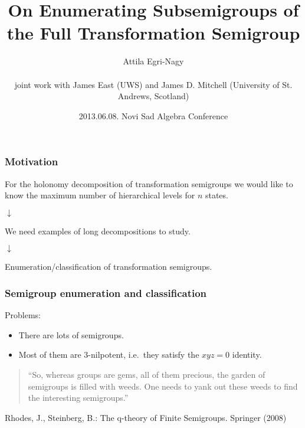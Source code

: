 \documentclass{beamer}
\newcommand{\jump}{\vskip6pt}
\begin{document}
\title[Subsemigroup Enumeration]{On Enumerating Subsemigroups of the Full Transformation Semigroup }
\author[e-n@]{Attila Egri-Nagy\\\ \\joint work with James East (UWS) and James D. Mitchell (University of St. Andrews, Scotland)}
\date[NSAC 2013]{2013.06.08. Novi Sad Algebra Conference}

\begin{frame}
\titlepage
\end{frame}

\begin{frame}\frametitle{Motivation}
\begin{center}
For the holonomy decomposition of transformation semigroups we would like to know the maximum number of hierarchical levels for $n$ states.
\centerline{$\downarrow$}
We need examples of long decompositions to study.
\centerline{$\downarrow$}
Enumeration/classification of transformation semigroups.
\end{center}
\end{frame}

\begin{frame}\frametitle{Semigroup enumeration and classification}
Problems:
\begin{itemize}
\item There are lots of semigroups.
\item Most of them are 3-nilpotent, i.e.\ they satisfy the $xyz=0$ identity.
\end{itemize}
\jump

\begin{quote}
``So, whereas groups are
gems, all of them precious, the garden of semigroups is filled with weeds. One
needs to yank out these weeds to find the interesting semigroups.''
\end{quote}
Rhodes, J., Steinberg, B.: The q-theory of Finite Semigroups. Springer (2008)
\end{frame}
\end{document}
